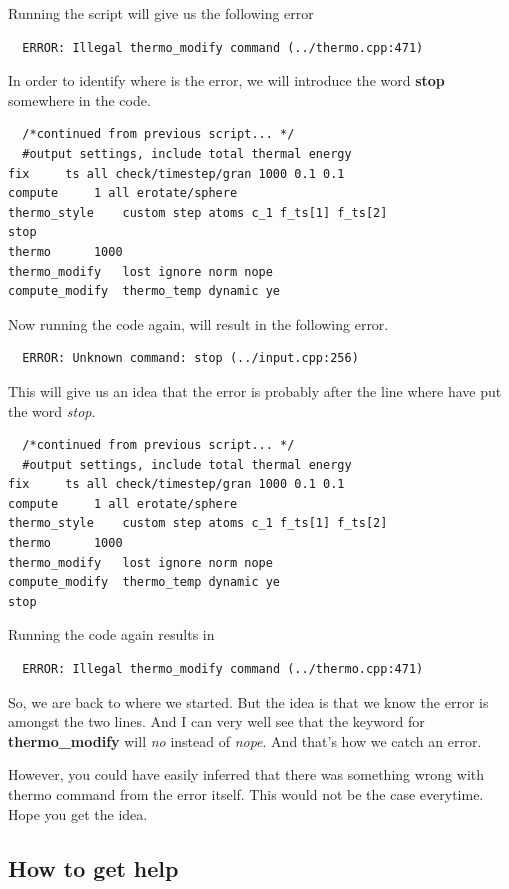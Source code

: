 \documentclass{tufte-book} %
\begin{document}
Running the script will give us the following error
\begin{verbatim}
  ERROR: Illegal thermo_modify command (../thermo.cpp:471)
\end{verbatim}
In order to identify where is the error, we will introduce the word \textbf{stop} somewhere in the code.
\begin{verbatim}
  /*continued from previous script... */
  #output settings, include total thermal energy
fix		ts all check/timestep/gran 1000 0.1 0.1
compute		1 all erotate/sphere
thermo_style	custom step atoms c_1 f_ts[1] f_ts[2]  
stop
thermo		1000
thermo_modify	lost ignore norm nope
compute_modify	thermo_temp dynamic ye
  \end{verbatim}

Now running the code again, will result in the following error.

\begin{verbatim}
  ERROR: Unknown command: stop (../input.cpp:256)

\end{verbatim}
This will give us an idea that the error is probably after the line where have put the word \textit{stop}.
\begin{verbatim}
  /*continued from previous script... */
  #output settings, include total thermal energy
fix		ts all check/timestep/gran 1000 0.1 0.1
compute		1 all erotate/sphere
thermo_style	custom step atoms c_1 f_ts[1] f_ts[2]  
thermo		1000
thermo_modify	lost ignore norm nope
compute_modify	thermo_temp dynamic ye
stop
  \end{verbatim}

Running the code again results in
\begin{verbatim}
  ERROR: Illegal thermo_modify command (../thermo.cpp:471)
\end{verbatim}
So, we are back to where we started. But the idea is that we know the error is amongst the two lines. And I can very well see that the keyword for \textbf{thermo\_modify} will \emph{no} instead of \textit{nope}. And that's how we catch an error.

However, you could have easily inferred that there was something wrong with thermo command from the error itself. This would not be the case everytime. Hope you get the idea.

\subsection{How to get help}
\end{document}
